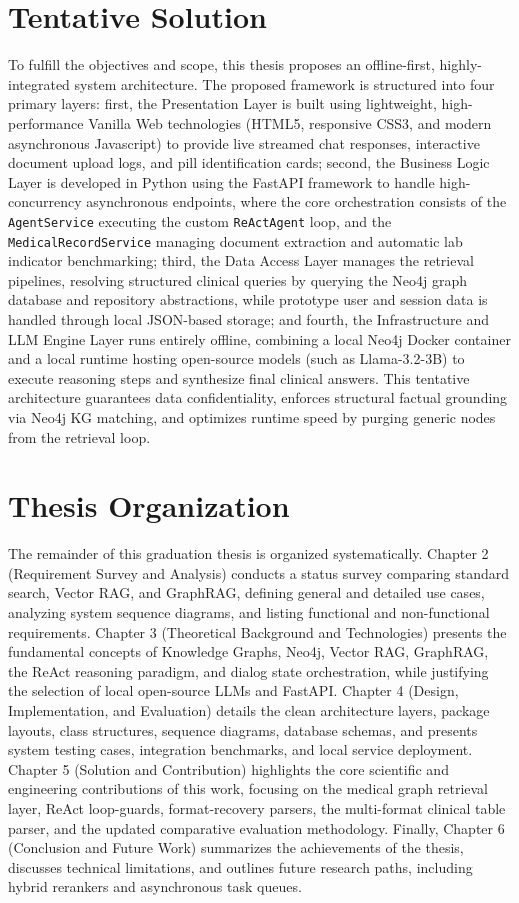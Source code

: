 \documentclass[../main.tex]{subfiles}
\begin{document}
\section{Tentative Solution}
\label{section:1.3}
To fulfill the objectives and scope, this thesis proposes an offline-first, highly-integrated system architecture. The proposed framework is structured into four primary layers: first, the Presentation Layer is built using lightweight, high-performance Vanilla Web technologies (HTML5, responsive CSS3, and modern asynchronous Javascript) to provide live streamed chat responses, interactive document upload logs, and pill identification cards; second, the Business Logic Layer is developed in Python using the FastAPI framework to handle high-concurrency asynchronous endpoints, where the core orchestration consists of the \texttt{AgentService} executing the custom \texttt{ReActAgent} loop, and the \texttt{MedicalRecordService} managing document extraction and automatic lab indicator benchmarking; third, the Data Access Layer manages the retrieval pipelines, resolving structured clinical queries by querying the Neo4j graph database and repository abstractions, while prototype user and session data is handled through local JSON-based storage; and fourth, the Infrastructure and LLM Engine Layer runs entirely offline, combining a local Neo4j Docker container and a local runtime hosting open-source models (such as Llama-3.2-3B) to execute reasoning steps and synthesize final clinical answers.
This tentative architecture guarantees data confidentiality, enforces structural factual grounding via Neo4j KG matching, and optimizes runtime speed by purging generic nodes from the retrieval loop.

\section{Thesis Organization}
\label{section:1.4}
The remainder of this graduation thesis is organized systematically. Chapter 2 (Requirement Survey and Analysis) conducts a status survey comparing standard search, Vector RAG, and GraphRAG, defining general and detailed use cases, analyzing system sequence diagrams, and listing functional and non-functional requirements. Chapter 3 (Theoretical Background and Technologies) presents the fundamental concepts of Knowledge Graphs, Neo4j, Vector RAG, GraphRAG, the ReAct reasoning paradigm, and dialog state orchestration, while justifying the selection of local open-source LLMs and FastAPI. Chapter 4 (Design, Implementation, and Evaluation) details the clean architecture layers, package layouts, class structures, sequence diagrams, database schemas, and presents system testing cases, integration benchmarks, and local service deployment. Chapter 5 (Solution and Contribution) highlights the core scientific and engineering contributions of this work, focusing on the medical graph retrieval layer, ReAct loop-guards, format-recovery parsers, the multi-format clinical table parser, and the updated comparative evaluation methodology. Finally, Chapter 6 (Conclusion and Future Work) summarizes the achievements of the thesis, discusses technical limitations, and outlines future research paths, including hybrid rerankers and asynchronous task queues.
\end{document}
